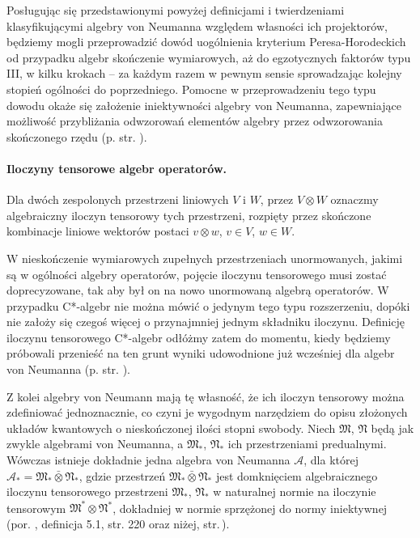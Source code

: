 Posługując się przedstawionymi powyżej definicjami i twierdzeniami klasyfikującymi
algebry von Neumanna
względem własności ich projektorów,
będziemy mogli przeprowadzić dowód uogólnienia kryterium Peresa-Horodeckich
od przypadku algebr skończenie wymiarowych,
aż do egzotycznych faktorów typu III,
w kilku krokach -- za każdym razem w pewnym sensie
sprowadzając kolejny stopień ogólności do poprzedniego.
Pomocne w przeprowadzeniu tego typu dowodu okaże się założenie iniektywności
algebry von Neumanna, zapewniające możliwość przybliżania odwzorowań
elementów algebry przez odwzorowania skończonego rzędu
(p. str. \pageref{def:injectivevNalg}).

\paragraph{Iloczyny tensorowe algebr operatorów.}
Dla dwóch zespolonych przestrzeni liniowych $V$ i $W$,
przez $V \! \otimes \! W$ oznaczmy algebraiczny iloczyn tensorowy tych przestrzeni,
rozpięty przez skończone kombinacje liniowe wektorów postaci
$v \otimes w$, $v \in V$, $w \in W$.

W nieskończenie wymiarowych zupełnych przestrzeniach unormowanych,
jakimi są w ogólności algebry operatorów,
pojęcie iloczynu tensorowego musi zostać doprecyzowane, tak aby
był on na nowo unormowaną algebrą operatorów.
W przypadku C*-algebr nie można mówić o jedynym tego typu rozszerzeniu,
dopóki nie założy się czegoś więcej o przynajmniej jednym składniku iloczynu.
Definicję iloczynu tensorowego C*-algebr odłóżmy zatem do momentu,
kiedy będziemy próbowali przenieść na ten grunt wyniki udowodnione już
wcześniej dla algebr von Neumanna (p. str. \pageref{sec:HorCstar}).

Z kolei algebry von Neumann mają tę własność, że ich iloczyn
tensorowy można zdefiniować jednoznacznie,
co czyni je wygodnym narzędziem do opisu złożonych układów kwantowych
o nieskończonej ilości stopni swobody.
Niech $\mathfrak{M}$, $\mathfrak{N}$ będą jak zwykle algebrami von Neumanna,
a $\mathfrak{M}_{*}$, $\mathfrak{N}_{*}$ ich przestrzeniami predualnymi.
Wówczas istnieje dokładnie jedna algebra von Neumanna $\mathcal{A}$,
dla której
$\mathcal{A}_{*} = \mathfrak{M}_{*} \bar{\otimes} \mathfrak{N}_{*}$,
gdzie przestrzeń
$\mathfrak{M}_{*} \bar{\otimes} \mathfrak{N}_{*}$ jest domknięciem
algebraicznego iloczynu tensorowego przestrzeni
$\mathfrak{M}_{*}$, $\mathfrak{N}_{*}$ w naturalnej normie na iloczynie
tensorowym $\mathfrak{M}^{*} \otimes \mathfrak{N}^{*}$,
dokładniej w normie sprzężonej do normy iniektywnej
(por. \cite{Takesaki1}, definicja 5.1, str. 220 oraz niżej,
str.\,\pageref{def:projectiveoperatornorm}).

